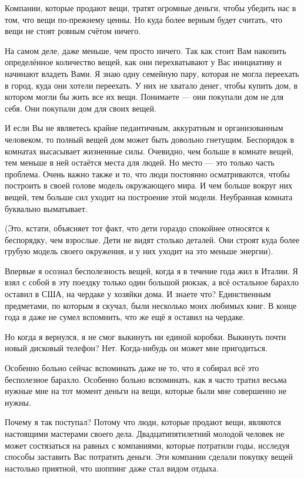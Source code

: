 \documentclass[ebook,12pt,oneside,openany]{memoir}
\begin{document}
Компании, которые продают вещи, тратят огромные деньги, чтобы убедить
нас в том, что вещи по-прежнему ценны. Но куда более верным будет
считать, что вещи не стоят ровным счётом ничего.

На самом деле, даже меньше, чем просто ничего. Так как стоит Вам
накопить определённое количество вещей, как они перехватывают у Вас
инициативу и начинают владеть Вами. Я знаю одну семейную пару, которая
не могла переехать в город, куда они хотели переехать. У них не
хватало денег, чтобы купить дом, в котором могли бы жить все их вещи.
Понимаете — они покупали дом не для себя. Они покупали дом для своих
вещей.

И если Вы не являетесь крайне педантичным, аккуратным и организованным
человеком, то полный вещей дом может быть довольно гнетущим.
Беспорядок в комнатах высасывает жизненные силы. Очевидно, чем больше
в комнате вещей, тем меньше в ней остаётся места для людей. Но место —
это только часть проблема. Очень важно также и то, что люди постоянно
осматриваются, чтобы построить в своей голове модель окружающего мира.
И чем больше вокруг них вещей, тем больше сил уходит на построение
этой модели. Неубранная комната буквально выматывает.

(Это, кстати, объясняет тот факт, что дети гораздо спокойнее относятся
к беспорядку, чем взрослые. Дети не видят столько деталей. Они строят
куда более грубую модель своего окружения, и у них уходит на это
меньше энергии).

Впервые я осознал бесполезность вещей, когда я в течение года жил в
Италии. Я взял с собой в эту поездку только один большой рюкзак, а всё
остальное барахло оставил в США, на чердаке у хозяйки дома. И знаете
что? Единственным предметами, по которым я скучал, были несколько моих
любимых книг. В конце года я даже не сумел вспомнить, что же ещё я
оставил на чердаке.

Но когда я вернулся, я не смог выкинуть ни единой коробки. Выкинуть
почти новый дисковый телефон? Нет. Когда-нибудь он может мне
пригодиться.

Особенно больно сейчас вспоминать даже не то, что я собирал всё это
бесполезное барахло. Особенно больно вспоминать, как я часто тратил
весьма нужные мне на тот момент деньги на вещи, которые были мне
совершенно не нужны.

Почему я так поступал? Потому что люди, которые продают вещи, являются
настоящими мастерами своего дела. Двадцатипятилетний молодой человек
не может состязаться на равных с компаниями, которые потратили годы,
исследуя способы заставить Вас потратить деньги. Эти компании сделали
покупку вещей настолько приятной, что шоппинг даже стал видом отдыха.
\end{document}
